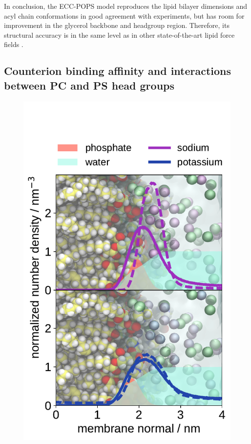 \documentclass[journal=jpcbfk,manuscript=article]{achemso}
\newlength{\figheight}
\begin{document}
In conclusion, the ECC-POPS model reproduces the lipid bilayer dimensions and
acyl chain conformations in good agreement with experiments, but has room for
improvement in the glycerol backbone and headgroup region. Therefore,
its structural accuracy is in the same level as in other state-of-the-art
lipid force fields \cite{botan15, ollila16, Pluhackova2016, NMRlipidsIV}.
 
 
\subsection{Counterion binding affinity and interactions between PC and PS head groups}

\begin{figure}[tbp!] 
  \centering 
  \includegraphics[height=\figheight]{../img/ecc_pops/density_profiles_na-k-counterions_wat_phos_compar_purePOPS_ecclipids-lipid17.pdf}

\end{figure}
\end{document}
